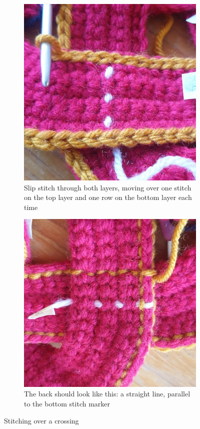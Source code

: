 \documentclass[openany]{book}
\begin{document}
\begin{figure}[H]
\begin{subfigure}[t]{.45\textwidth}\centering
\includegraphics[width=.95\textwidth]{bk/top7}
\caption{Slip stitch through both layers, moving over one stitch on the top layer and one row on the bottom layer each time}
\end{subfigure}
%
\begin{subfigure}[t]{.45\textwidth}
		\centering
		\includegraphics[width=.95\textwidth]{bk/top8}
\caption{The back should look like this: a straight line, parallel to the bottom stitch marker}
\end{subfigure}

\caption{Stitching over a crossing}
\end{figure}
\end{document}
